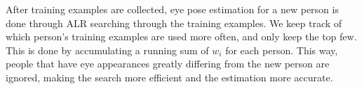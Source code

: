 After training examples are collected, eye pose estimation for a new person is done through ALR searching through the training examples.  We keep track of which person's training examples are used more often, and only keep the top few.  This is done by accumulating a running sum of \(w_i\) for each person.  This way, people that have eye appearances greatly differing from the new person are ignored, making the search more efficient and the estimation more accurate.
